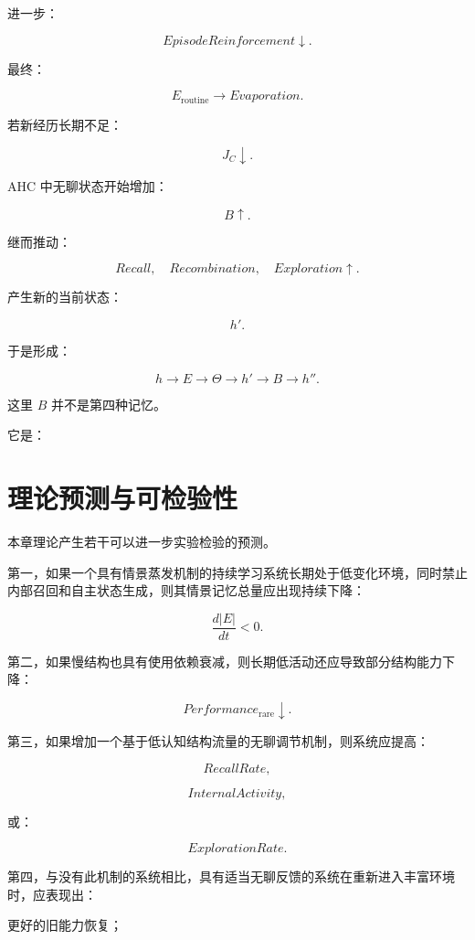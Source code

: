 进一步：

\[
EpisodeReinforcement\downarrow.
\]

最终：

\[
E_{\mathrm{routine}}
\rightarrow
Evaporation.
\]

若新经历长期不足：

\[
J_C\downarrow.
\]

AHC 中无聊状态开始增加：

\[
B\uparrow.
\]

继而推动：

\[
Recall,
\quad
Recombination,
\quad
Exploration
\uparrow.
\]

产生新的当前状态：

\[
h'.
\]

于是形成：

\[
\boxed{
h
\rightarrow
E
\rightarrow
\Theta
\rightarrow
h'
\rightarrow
B
\rightarrow
h''.
}
\]

这里 $B$ 并不是第四种记忆。

它是：

\begin{statementbox}
\centering
{}
\end{statementbox}

\section{理论预测与可检验性}

本章理论产生若干可以进一步实验检验的预测。

第一，如果一个具有情景蒸发机制的持续学习系统长期处于低变化环境，同时禁止内部召回和自主状态生成，则其情景记忆总量应出现持续下降：

\[
\frac{d|E|}{dt}<0.
\]

第二，如果慢结构也具有使用依赖衰减，则长期低活动还应导致部分结构能力下降：

\[
Performance_{\mathrm{rare}}
\downarrow.
\]

第三，如果增加一个基于低认知结构流量的无聊调节机制，则系统应提高：

\[
RecallRate,
\]

\[
InternalActivity,
\]

或：

\[
ExplorationRate.
\]

第四，与没有此机制的系统相比，具有适当无聊反馈的系统在重新进入丰富环境时，应表现出：

更好的旧能力恢复；

